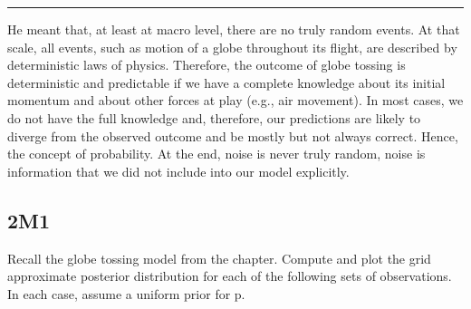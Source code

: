 \documentclass[
]{book}
\begin{document}
\begin{center}\rule{0.5\linewidth}{0.5pt}\end{center}

He meant that, at least at macro level, there are no truly random events. At that scale, all events, such as motion of a globe throughout its flight, are described by deterministic laws of physics. Therefore, the outcome of globe tossing is deterministic and predictable if we have a complete knowledge about its initial momentum and about other forces at play (e.g., air movement). In most cases, we do not have the full knowledge and, therefore, our predictions are likely to diverge from the observed outcome and be mostly but not always correct. Hence, the concept of probability. At the end, noise is never truly random, noise is information that we did not include into our model explicitly.

\hypertarget{m1}{%
\subsection*{2M1}\label{m1}}

Recall the globe tossing model from the chapter. Compute and plot the grid approximate posterior distribution for each of the following sets of observations. In each case, assume a uniform prior for p.
\end{document}
